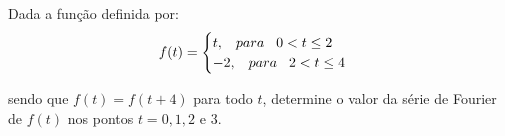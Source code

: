 \linespread{1.5}
Dada a função definida por:
\begin{equation*}
    f(t) = \begin{cases}
     t, \hspace{0.3cm} para \hspace{0.3cm} 0 < t \leq 2\\
    -2, \hspace{0.3cm} para \hspace{0.3cm} 2 < t \leq 4
    \end{cases}
\end{equation*}

sendo que $f(t) = f(t+4)$ para todo $t$, determine o valor da série de Fourier de $f(t)$ nos pontos $t = 0, 1, 2$ e $3$.